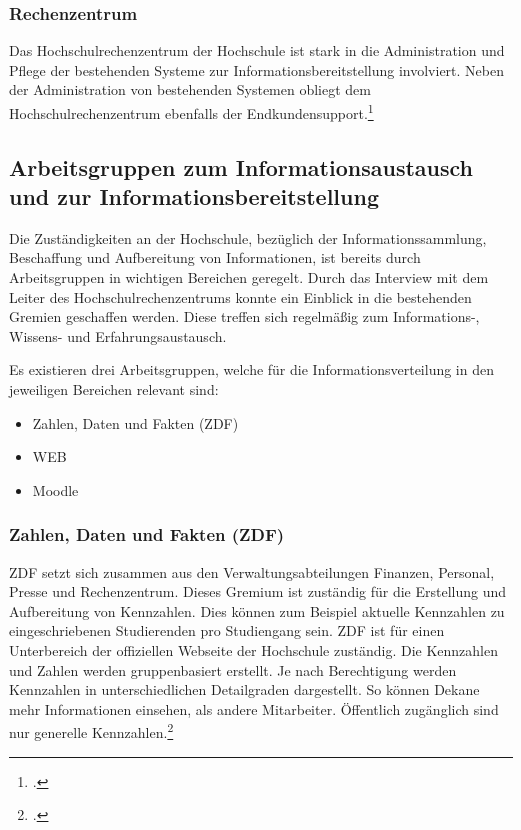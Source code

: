 \subsubsection{Rechenzentrum}
Das Hochschulrechenzentrum der Hochschule ist stark in die Administration und Pflege der bestehenden Systeme zur Informationsbereitstellung involviert. Neben der Administration von bestehenden Systemen obliegt dem Hochschulrechenzentrum ebenfalls der Endkundensupport.\footcite{gunter_muller_interview}

\subsection{Arbeitsgruppen zum Informationsaustausch und zur Informationsbereitstellung}
\label{subsection_arbeitsgruppen_informationsaustausch}
Die Zuständigkeiten an der Hochschule, bezüglich der Informationssammlung, Beschaffung und Aufbereitung von Informationen, ist bereits durch Arbeitsgruppen in wichtigen Bereichen geregelt. Durch das Interview mit dem Leiter des Hochschulrechenzentrums konnte ein Einblick in die bestehenden Gremien geschaffen werden. Diese treffen sich regelmäßig zum Informations-, Wissens- und Erfahrungsaustausch.

Es existieren drei Arbeitsgruppen, welche für die Informationsverteilung in den jeweiligen Bereichen relevant sind:

\begin{itemize}
	\item Zahlen, Daten und Fakten (ZDF)
	\item WEB
	\item Moodle
\end{itemize}

\subsubsection{Zahlen, Daten und Fakten (ZDF)}
ZDF setzt sich zusammen aus den Verwaltungsabteilungen Finanzen, Personal, Presse und Rechenzentrum. Dieses Gremium ist zuständig für die Erstellung und Aufbereitung von Kennzahlen. Dies können zum Beispiel aktuelle Kennzahlen zu eingeschriebenen Studierenden pro Studiengang sein.  ZDF ist für einen Unterbereich der offiziellen Webseite der Hochschule zuständig. Die Kennzahlen und Zahlen werden gruppenbasiert erstellt. Je nach Berechtigung werden Kennzahlen in unterschiedlichen Detailgraden dargestellt. So können Dekane mehr Informationen einsehen, als andere Mitarbeiter. Öffentlich zugänglich sind nur generelle Kennzahlen.\footcite{gunter_muller_interview}

